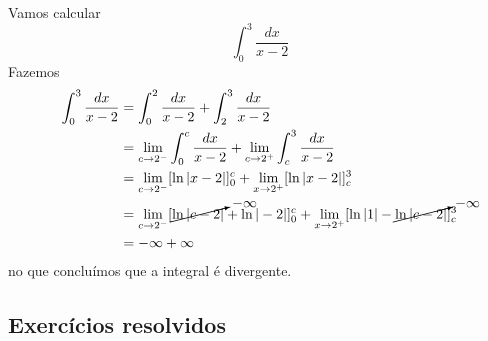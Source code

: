 \begin{ex}
  Vamos calcular
  \begin{equation}
    \int_0^3\frac{dx}{x-2}
  \end{equation}
  Fazemos
  \begin{align}
    \int_0^3\frac{dx}{x-2} &= \int_0^2\frac{dx}{x-2} + \int_2^3\frac{dx}{x-2}\\
                           &= \lim_{c\to 2^-}\int_0^c\frac{dx}{x-2} + \lim_{c\to 2^+}\int_c^3\frac{dx}{x-2}\\
                           &= \lim_{c\to 2^-}[\ln|x-2|]_0^c + \lim_{x\to 2^+}[\ln|x-2|]_c^3\\
                           &= \lim_{c\to 2^-}[\cancelto{-\infty}{\ln|c-2|} + \ln|-2|]_0^c + \lim_{x\to 2^+}[\ln|1| - \cancelto{-\infty}{\ln|c-2|}]_c^3\\
                           &= -\infty + \infty
  \end{align}
  no que concluímos que a integral é divergente.
\end{ex}

\subsection{Exercícios resolvidos}

